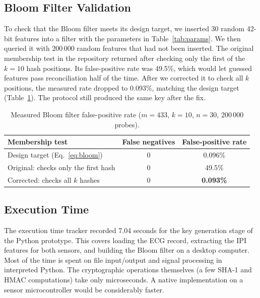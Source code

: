 \subsection{Bloom Filter Validation}
To check that the Bloom filter meets its design target, we inserted 30 random 42-bit features into a filter with the parameters in Table~\ref{tab:params}. We then queried it with 200\,000 random features that had not been inserted. The original membership test in the repository returned after checking only the first of the $k = 10$ hash positions. Its false-positive rate was 49.5\%, which would let guessed features pass reconciliation half of the time. After we corrected it to check all $k$ positions, the measured rate dropped to 0.093\%, matching the design target (Table~\ref{tab:bloomfp}). The protocol still produced the same key after the fix.

\begin{table}[htbp]
  \centering
  \caption{Measured Bloom filter false-positive rate ($m = 433$, $k = 10$, $n = 30$, 200\,000 probes).}
  \label{tab:bloomfp}
  \begin{tabular}{l c c}
    \toprule
    \textbf{Membership test} & \textbf{False negatives} & \textbf{False-positive rate} \\
    \midrule
    Design target (Eq.~\ref{eq:bloom})   & 0 & 0.096\% \\
    Original: checks only the first hash & 0 & 49.5\% \\
    Corrected: checks all $k$ hashes     & 0 & \textbf{0.093\%} \\
    \bottomrule
  \end{tabular}
\end{table}

\subsection{Execution Time}
The execution time tracker recorded 7.04 seconds for the key generation stage of the Python prototype. This covers loading the ECG record, extracting the IPI features for both sensors, and building the Bloom filter on a desktop computer. Most of the time is spent on file input/output and signal processing in interpreted Python. The cryptographic operations themselves (a few SHA-1 and HMAC computations) take only microseconds. A native implementation on a sensor microcontroller would be considerably faster.
